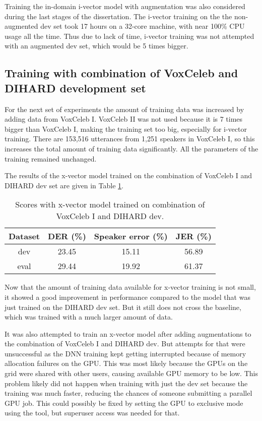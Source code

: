 		Training the in-domain i-vector model with augmentation was also considered during the last stages of the dissertation. The i-vector training on the the non-augmented dev set took 17 hours on a 32-core machine, with near 100\% CPU usage all the time. Thus due to lack of time, i-vector training was not attempted with an augmented dev set, which would be 5 times bigger.
		
		\subsection{Training with combination of VoxCeleb and DIHARD development set}
			For the next set of experiments the amount of training data was increased by adding data from VoxCeleb I. VoxCeleb II was not used because it is 7 times bigger than VoxCeleb I, making the training set too big, especially for i-vector training. There are 153,516 utterances from 1,251 speakers in VoxCeleb I, so this increases the total amount of training data significantly. All the parameters of the training remained unchanged.
			
			The results of the x-vector model trained on the combination of VoxCeleb I and DIHARD dev set are given in Table \ref{table-voxdev-xvec}.
			
			\begin{table}[h]
				\centering
				\begin{tabular}{|c|c|c|c|}
					\hline
					Dataset & DER (\%) & Speaker error (\%) & JER (\%) \\
					\hline
					dev & 23.45 & 15.11 & 56.89 \\
					\hline
					eval & 29.44 & 19.92 & 61.37 \\
					\hline
				\end{tabular}
				\caption{Scores with x-vector model trained on combination of VoxCeleb I and DIHARD dev.}
				\label{table-voxdev-xvec}
			\end{table}
		
		Now that the amount of training data available for x-vector training is not small, it showed a good improvement in performance compared to the model that was just trained on the DIHARD dev set. But it still does not cross the baseline, which was trained with a much larger amount of data.
		
		It was also attempted to train an x-vector model after adding augmentations to the combination of VoxCeleb I and DIHARD dev. But attempts for that were unsuccessful as the DNN training kept getting interrupted because of memory allocation failures on the GPU. This was most likely because the GPUs on the grid were shared with other users, causing available GPU memory to be low. This problem likely did not happen when training with just the dev set because the training was much faster, reducing the chances of someone submitting a parallel GPU job. This could possibly be fixed by setting the GPU to exclusive mode using the  tool, but superuser access was needed for that.
				
